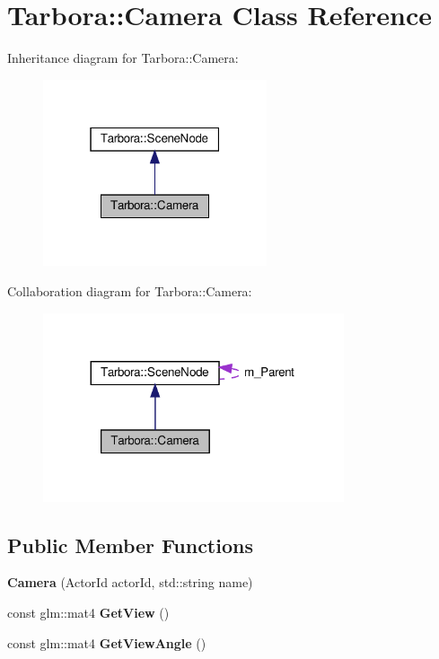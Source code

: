\hypertarget{classTarbora_1_1Camera}{}\section{Tarbora\+:\+:Camera Class Reference}
\label{classTarbora_1_1Camera}


Inheritance diagram for Tarbora\+:\+:Camera\+:\nopagebreak
\begin{figure}[H]
\begin{center}
\leavevmode
\includegraphics[width=187pt]{classTarbora_1_1Camera__inherit__graph}
\end{center}
\end{figure}


Collaboration diagram for Tarbora\+:\+:Camera\+:\nopagebreak
\begin{figure}[H]
\begin{center}
\leavevmode
\includegraphics[width=251pt]{classTarbora_1_1Camera__coll__graph}
\end{center}
\end{figure}
\subsection*{Public Member Functions}
\begin{DoxyCompactItemize}
\item 
\mbox{\label{classTarbora_1_1Camera_a45153edee036e9ffd270fe4ac4a5067d}} 
{\bfseries Camera} (Actor\+Id actor\+Id, std\+::string name)
\item 
\mbox{\label{classTarbora_1_1Camera_a0b29c84c5ac0c00e847c6690bda0ca3a}} 
const glm\+::mat4 {\bfseries Get\+View} ()
\item 
\mbox{\label{classTarbora_1_1Camera_a57738b366d754a3657a865b75c23d8fc}} 
const glm\+::mat4 {\bfseries Get\+View\+Angle} ()
\end{DoxyCompactItemize}
